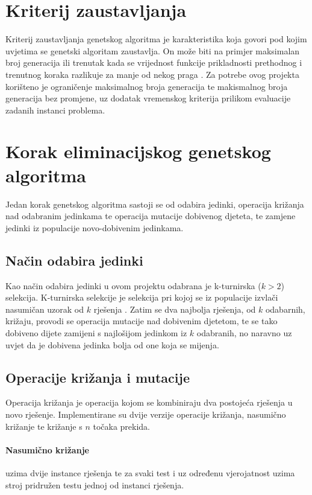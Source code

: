 \documentclass[utf8, seminar, numeric]{fer}
\begin{document}
\section{Kriterij zaustavljanja}

Kriterij zaustavljanja genetskog algoritma je karakteristika koja govori pod kojim uvjetima se genetski algoritam zaustavlja. On može biti na primjer maksimalan broj generacija ili trenutak kada se vrijednost funkcije prikladnosti prethodnog i trenutnog koraka razlikuje za manje od nekog praga \cite{hmoea}. Za potrebe ovog projekta korišteno je ograničenje maksimalnog broja generacija te makismalnog broja generacija bez promjene, uz dodatak vremenskog kriterija prilikom evaluacije zadanih instanci problema.

\section{Korak eliminacijskog genetskog algoritma}

Jedan korak genetskog algoritma sastoji se od odabira jedinki, operacija križanja nad odabranim jedinkama te operacija mutacije dobivenog djeteta, te zamjene jedinki iz populacije novo-dobivenim jedinkama.

\subsection{Način odabira jedinki}

Kao način odabira jedinki u ovom projektu odabrana je k-turnirska ($k > 2$) selekcija. K-turnirska selekcije je selekcija pri kojoj se iz populacije izvlači nasumičan uzorak od $k$ rješenja \cite{cupicmmeta}. Zatim se dva najbolja rješenja, od $k$ odabarnih, križaju, provodi se operacija mutacije nad dobivenim djetetom, te se tako dobiveno dijete zamijeni s najlošijom jedinkom iz $k$ odabranih, no naravno uz uvjet da je dobivena jedinka bolja od one koja se mijenja.

\subsection{Operacije križanja i mutacije}

Operacija križanja je operacija kojom se kombiniraju dva postojeća rješenja u novo rješenje. Implementirane su dvije verzije operacije križanja, nasumično križanje te križanje s $n$ točaka prekida.

\paragraph{Nasumično križanje} uzima dvije instance rješenja te za svaki test i uz određenu vjerojatnost uzima stroj pridružen testu jednoj od instanci rješenja.
\end{document}
